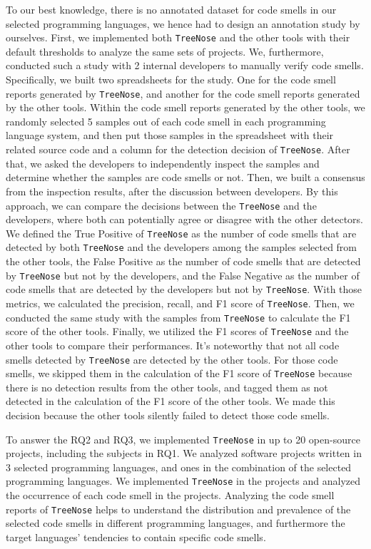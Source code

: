 To our best knowledge, there is no annotated dataset for code smells in our selected programming languages, we hence had to design an annotation study by ourselves.
First, we implemented both \texttt{TreeNose} and the other tools with their default thresholds to analyze the same sets of projects.
We, furthermore, conducted such a study with 2 internal developers to manually verify code smells. Specifically, we built two spreadsheets for the study. 
One for the code smell reports generated by \texttt{TreeNose}, and another for the code smell reports generated by the other tools. 
Within the code smell reports generated by the other tools, we randomly selected 5 samples out of each code smell in each programming language system, and then put those samples in the spreadsheet with their related source code and a column for the detection decision of \texttt{TreeNose}.
After that, we asked the developers to independently inspect the samples and determine whether the samples are code smells or not. 
Then, we built a consensus from the inspection results, after the discussion between developers. By this approach, we can compare the decisions between the \texttt{TreeNose} and the developers, where both can potentially agree or disagree with the other detectors.
We defined the True Positive of \texttt{TreeNose} as the number of code smells that are detected by both \texttt{TreeNose} and the developers among the samples selected from the other tools, 
the False Positive as the number of code smells that are detected by \texttt{TreeNose} but not by the developers, and the False Negative as the number of code smells that are detected by the developers but not by \texttt{TreeNose}.
With those metrics, we calculated the precision, recall, and F1 score of \texttt{TreeNose}. Then, we conducted the same study with the samples from \texttt{TreeNose} to calculate the F1 score of the other tools. 
Finally, we utilized the F1 scores of \texttt{TreeNose} and the other tools to compare their performances. It's noteworthy that not all code smells detected by \texttt{TreeNose} are detected by the other tools. 
For those code smells, we skipped them in the calculation of the F1 score of \texttt{TreeNose} because there is no detection results from the other tools,
and tagged them as not detected in the calculation of the F1 score of the other tools. We made this decision because the other tools silently failed to detect those code smells.


To answer the RQ2 and RQ3, we implemented \texttt{TreeNose} in up to 20 open-source projects, including the subjects in RQ1.
 We analyzed software projects written in 3 selected programming languages, and ones in the combination of the selected programming languages. 
 We implemented \texttt{TreeNose} in the projects and analyzed the occurrence of each code smell in the projects. 
 Analyzing the code smell reports of \texttt{TreeNose} helps to understand the distribution and prevalence of the selected 
 code smells in different programming languages, and furthermore the target languages' tendencies to contain specific code smells.

